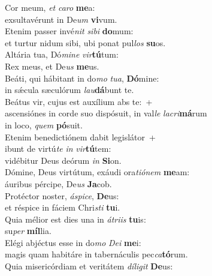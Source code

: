 \evenverse Cor meum, \textit{et} \textit{ca}\textit{ro} \textbf{me}a:~\*\\
\evenverse exsultavérunt in De\textit{um} \textbf{vi}vum.\\
\oddverse Etenim passer invé\textit{nit} \textit{si}\textit{bi} \textbf{do}mum:~\*\\
\oddverse et turtur nidum sibi, ubi ponat pul\textit{los} \textbf{su}os.\\
\evenverse Altária tua, Dó\textit{mi}\textit{ne} \textit{vir}\textbf{tú}tum:~\*\\
\evenverse Rex meus, et De\textit{us} \textbf{me}us.\\
\oddverse Beáti, qui hábitant in do\textit{mo} \textit{tu}\textit{a}, \textbf{Dó}mine:~\*\\
\oddverse in sǽcula sæculórum \textit{lau}\textbf{dá}bunt te.\\
\evenverse Beátus vir, cujus est auxílium abs te:~+\\
\evenverse  ascensiónes in corde suo dispósuit, in val\textit{le} \textit{la}\textit{cri}\textbf{má}rum~\*\\
\evenverse in loco, \textit{quem} \textbf{pó}suit.\\
\oddverse Etenim benedictiónem dabit legislátor~+\\
\oddverse  ibunt de virtú\textit{te} \textit{in} \textit{vir}\textbf{tú}tem:~\*\\
\oddverse vidébitur Deus deórum \textit{in} \textbf{Si}on.\\
\evenverse Dómine, Deus virtútum, exáudi ora\textit{ti}\textit{ó}\textit{nem} \textbf{me}am:~\*\\
\evenverse áuribus pércipe, De\textit{us} \textbf{Ja}cob.\\
\oddverse Protéctor noster, \textit{á}\textit{spi}\textit{ce}, \textbf{De}us:~\*\\
\oddverse et réspice in fáciem Chri\textit{sti} \textbf{tu}i.\\
\evenverse Quia mélior est dies una in \textit{á}\textit{tri}\textit{is} \textbf{tu}is:~\*\\
\evenverse su\textit{per} \textbf{míl}lia.\\
\oddverse Elégi abjéctus esse in do\textit{mo} \textit{De}\textit{i} \textbf{me}i:~\*\\
\oddverse magis quam habitáre in tabernáculis pec\textit{ca}\textbf{tó}rum.\\
\evenverse Quia misericórdiam et veritátem \textit{dí}\textit{li}\textit{git} \textbf{De}us:~\*\\
